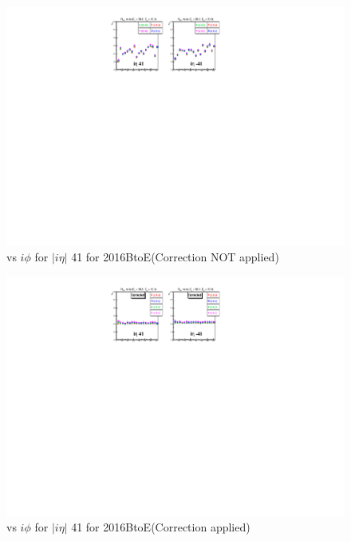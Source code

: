 \begin{figure}[h!]
\centering
\includegraphics[width=0.99\linewidth]{../Figures/Chap2/ImageFiles_HF/Ratio/2016/Corrected/2016BtoE/ieta41_E1E2Cut3Ietaiphi}
\caption{\ratiosl vs $i\phi$ for $|i\eta|$ 41 for 2016BtoE(Correction NOT applied)}
\label{fig:ieta41_E1E2Cut3IetaiphiBtoE}
\end{figure}
\begin{figure}[h!]
\centering
\includegraphics[width=0.99\linewidth]{../Figures/Chap2/ImageFiles_HF/Ratio/2016/Corrected/2016BtoE/ieta41_E1E2Cut3Ietaiphi_Crrtd}
\caption{\ratiosl vs $i\phi$ for $|i\eta|$ 41 for 2016BtoE(Correction applied)}
\label{fig:ieta41_E1E2Cut3Ietaiphi_CrrtdBtoE}
\end{figure}


